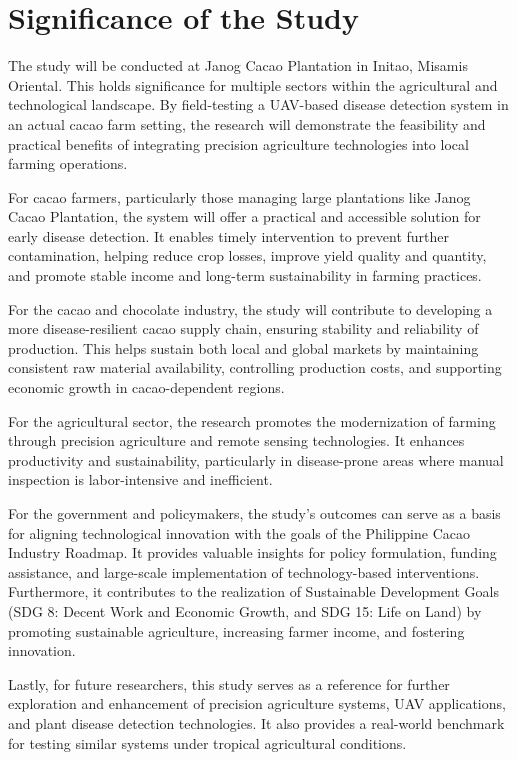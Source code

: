 {\section{Significance of the Study}
The study will be conducted at Janog Cacao Plantation in Initao, Misamis Oriental. This holds significance for multiple sectors within the agricultural and technological landscape. By field-testing a UAV-based disease detection system in an actual cacao farm setting, the research will demonstrate the feasibility and practical benefits of integrating precision agriculture technologies into local farming operations.

For cacao farmers, particularly those managing large plantations like Janog Cacao Plantation, the system will offer a practical and accessible solution for early disease detection. It enables timely intervention to prevent further contamination, helping reduce crop losses, improve yield quality and quantity, and promote stable income and long-term sustainability in farming practices.

For the cacao and chocolate industry, the study will contribute to developing a more disease-resilient cacao supply chain, ensuring stability and reliability of production. This helps sustain both local and global markets by maintaining consistent raw material availability, controlling production costs, and supporting economic growth in cacao-dependent regions.

For the agricultural sector, the research promotes the modernization of farming through precision agriculture and remote sensing technologies. It enhances productivity and sustainability, particularly in disease-prone areas where manual inspection is labor-intensive and inefficient.

For the government and policymakers, the study’s outcomes can serve as a basis for aligning technological innovation with the goals of the Philippine Cacao Industry Roadmap. It provides valuable insights for policy formulation, funding assistance, and large-scale implementation of technology-based interventions. Furthermore, it contributes to the realization of Sustainable Development Goals (SDG 8: Decent Work and Economic Growth, and SDG 15: Life on Land) by promoting sustainable agriculture, increasing farmer income, and fostering innovation.

Lastly, for future researchers, this study serves as a reference for further exploration and enhancement of precision agriculture systems, UAV applications, and plant disease detection technologies. It also provides a real-world benchmark for testing similar systems under tropical agricultural conditions.

}
